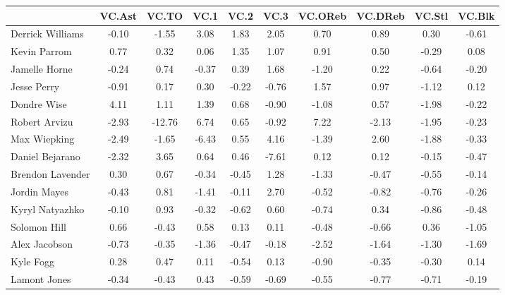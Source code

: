 \documentclass[10pt,letterpaper]{article}
\begin{document}
\begin{table}[ht]
\begin{center}
\begin{tabular}{lccccccccc}
  \hline
 & VC.Ast & VC.TO & VC.1 & VC.2 & VC.3 & VC.OReb & VC.DReb & VC.Stl & VC.Blk \\ 
  \hline
Derrick Williams & -0.10 & -1.55 & 3.08 & 1.83 & 2.05 & 0.70 & 0.89 & 0.30 & -0.61 \\ 
  Kevin Parrom & 0.77 & 0.32 & 0.06 & 1.35 & 1.07 & 0.91 & 0.50 & -0.29 & 0.08 \\ 
  Jamelle Horne & -0.24 & 0.74 & -0.37 & 0.39 & 1.68 & -1.20 & 0.22 & -0.64 & -0.20 \\ 
  Jesse Perry & -0.91 & 0.17 & 0.30 & -0.22 & -0.76 & 1.57 & 0.97 & -1.12 & 0.12 \\ 
  Dondre Wise & 4.11 & 1.11 & 1.39 & 0.68 & -0.90 & -1.08 & 0.57 & -1.98 & -0.22 \\ 
  Robert Arvizu & -2.93 & -12.76 & 6.74 & 0.65 & -0.92 & 7.22 & -2.13 & -1.95 & -0.23 \\ 
  Max Wiepking & -2.49 & -1.65 & -6.43 & 0.55 & 4.16 & -1.39 & 2.60 & -1.88 & -0.33 \\ 
  Daniel Bejarano & -2.32 & 3.65 & 0.64 & 0.46 & -7.61 & 0.12 & 0.12 & -0.15 & -0.47 \\ 
  Brendon Lavender & 0.30 & 0.67 & -0.34 & -0.45 & 1.28 & -1.33 & -0.47 & -0.55 & -0.14 \\ 
  Jordin Mayes & -0.43 & 0.81 & -1.41 & -0.11 & 2.70 & -0.52 & -0.82 & -0.76 & -0.26 \\ 
  Kyryl Natyazhko & -0.10 & 0.93 & -0.32 & -0.62 & 0.60 & -0.74 & 0.34 & -0.86 & -0.48 \\ 
  Solomon Hill & 0.66 & -0.43 & 0.58 & 0.13 & 0.11 & -0.48 & -0.66 & 0.36 & -1.05 \\ 
  Alex Jacobson & -0.73 & -0.35 & -1.36 & -0.47 & -0.18 & -2.52 & -1.64 & -1.30 & -1.69 \\ 
  Kyle Fogg & 0.28 & 0.47 & 0.11 & -0.54 & 0.13 & -0.90 & -0.35 & -0.30 & 0.14 \\ 
  Lamont Jones & -0.34 & -0.43 & 0.43 & -0.59 & -0.69 & -0.55 & -0.77 & -0.71 & -0.19 \\ 
   \hline
\end{tabular}
\end{center}
\end{table}
\end{document}
